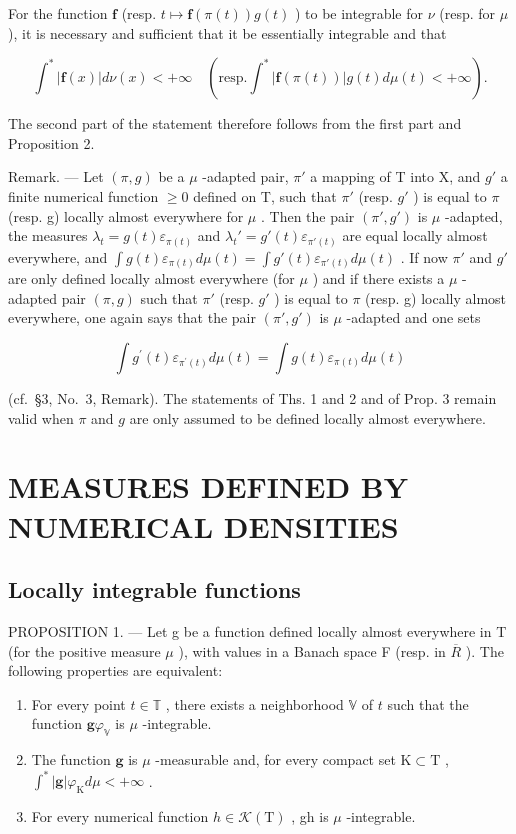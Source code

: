 For the function \(\mathbf{f}\) (resp. \(t\mapsto \mathbf{f}(\pi (t))g(t)\) ) to be integrable for \(\nu\) (resp. for \(\mu\) ), it is necessary and sufficient that it be essentially integrable and that

\[
\int^ {*} | \mathbf {f} (x) | d \nu (x) <   + \infty \quad (\mathrm{resp.} \int^ {*} | \mathbf {f} (\pi (t)) | g (t) d \mu (t) <   + \infty).
\]

The second part of the statement therefore follows from the first part and Proposition 2.

Remark. --- Let \((\pi, g)\) be a \(\mu\) -adapted pair, \(\pi'\) a mapping of T into X, and \(g'\) a finite numerical function \(\geqslant 0\) defined on T, such that \(\pi'\) (resp. \(g'\) ) is equal to \(\pi\) (resp. g) locally almost everywhere for \(\mu\) . Then the pair \((\pi', g')\) is \(\mu\) -adapted, the measures \(\lambda_t = g(t)\varepsilon_{\pi(t)}\) and \(\lambda_t' = g'(t)\varepsilon_{\pi'(t)}\) are equal locally almost everywhere, and \(\int g(t)\varepsilon_{\pi(t)} d\mu(t) = \int g'(t)\varepsilon_{\pi'(t)} d\mu(t)\) . If now \(\pi'\) and \(g'\) are only defined locally almost everywhere (for \(\mu\) ) and if there exists a \(\mu\) -adapted pair \((\pi, g)\) such that \(\pi'\) (resp. \(g'\) ) is equal to \(\pi\) (resp. g) locally almost everywhere, one again says that the pair \((\pi', g')\) is \(\mu\) -adapted and one sets

\[
\int g ^ {\prime} (t) \varepsilon_ {\pi^ {\prime} (t)} d \mu (t) = \int g (t) \varepsilon_ {\pi (t)} d \mu (t)
\]

(cf.~§3, No.~3, Remark). The statements of Ths. 1 and 2 and of Prop. 3 remain valid when \(\pi\) and \(g\) are only assumed to be defined locally almost everywhere.

\section{MEASURES DEFINED BY NUMERICAL DENSITIES}

\subsection{Locally integrable functions}

PROPOSITION 1. --- Let g be a function defined locally almost everywhere in T (for the positive measure \(\mu\) ), with values in a Banach space F (resp. in \(\overline{R}\) ). The following properties are equivalent:

\begin{enumerate}
\def\labelenumi{\alph{enumi})}
\item
  For every point \(t \in \mathbb{T}\) , there exists a neighborhood \(\mathbb{V}\) of \(t\) such that the function \(\mathbf{g}\varphi_{\mathbb{V}}\) is \(\mu\) -integrable.
\item
  The function \(\mathbf{g}\) is \(\mu\) -measurable and, for every compact set \(\mathrm{K} \subset \mathrm{T}\) , \(\int^{*} |\mathbf{g}| \varphi_{\mathrm{K}} d\mu < +\infty\) .
\item
  For every numerical function \(h \in \mathcal{K}(\mathrm{T})\) , gh is \(\mu\) -integrable.
\end{enumerate}

